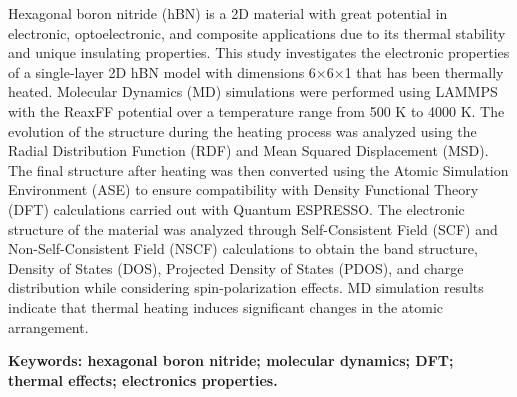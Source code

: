 {\singlespacing\indent%
\textit{}
Hexagonal boron nitride (hBN) is a 2D material with great potential in electronic, optoelectronic, and composite applications due to its thermal stability and unique insulating properties. This study investigates the electronic properties of a single-layer 2D hBN model with dimensions 6$\times$6$\times$1 that has been thermally heated. Molecular Dynamics (MD) simulations were performed using LAMMPS with the ReaxFF potential over a temperature range from 500 K to 4000 K. The evolution of the structure during the heating process was analyzed using the Radial Distribution Function (RDF) and Mean Squared Displacement (MSD). The final structure after heating was then converted using the Atomic Simulation Environment (ASE) to ensure compatibility with Density Functional Theory (DFT) calculations carried out with Quantum ESPRESSO. The electronic structure of the material was analyzed through Self-Consistent Field (SCF) and Non-Self-Consistent Field (NSCF) calculations to obtain the band structure, Density of States (DOS), Projected Density of States (PDOS), and charge distribution while considering spin-polarization effects. MD simulation results indicate that thermal heating induces significant changes in the atomic arrangement.
}


\vspace{5mm}

\noindent \textbf{Keywords: hexagonal boron nitride; molecular dynamics; DFT; thermal effects; electronics properties.} \textit{} %

